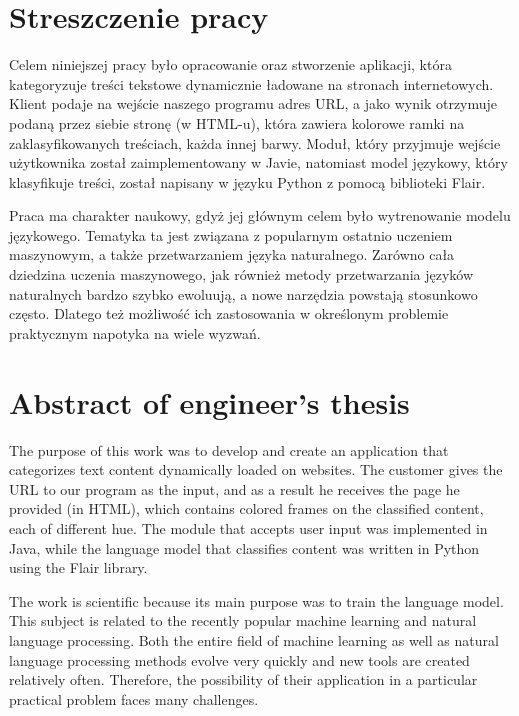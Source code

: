 \section*{Streszczenie pracy}

Celem niniejszej pracy było opracowanie oraz stworzenie aplikacji, która kategoryzuje treści tekstowe dynamicznie ładowane na stronach internetowych. Klient podaje na wejście naszego programu adres URL, a jako wynik otrzymuje podaną przez siebie stronę (w HTML-u), która zawiera kolorowe ramki na zaklasyfikowanych treściach, każda innej barwy. Moduł, który przyjmuje wejście użytkownika został zaimplementowany w Javie, natomiast model językowy, który klasyfikuje treści, został napisany w języku Python z pomocą biblioteki Flair.

Praca ma charakter naukowy, gdyż jej głównym celem było wytrenowanie modelu językowego. Tematyka ta jest związana z popularnym ostatnio uczeniem maszynowym, a także przetwarzaniem języka naturalnego. Zarówno cała dziedzina uczenia maszynowego, jak również metody przetwarzania języków naturalnych bardzo szybko ewoluują, a nowe narzędzia powstają stosunkowo często. Dlatego też możliwość ich zastosowania w określonym problemie praktycznym napotyka na wiele wyzwań.

\section*{Abstract of engineer's thesis}

The purpose of this work was to develop and create an application that categorizes text content dynamically loaded on websites. The customer gives the URL to our program as the input, and as a result he receives the page he provided (in HTML), which contains colored frames on the classified content, each of different hue. The module that accepts user input was implemented in Java, while the language model that classifies content was written in Python using the Flair library.

The work is scientific because its main purpose was to train the language model. This subject is related to the recently popular machine learning and natural language processing. Both the entire field of machine learning as well as natural language processing methods evolve very quickly and new tools are created relatively often. Therefore, the possibility of their application in a particular practical problem faces many challenges.
















